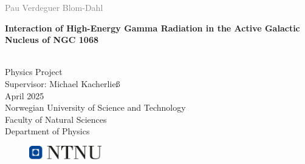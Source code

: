 \documentclass[a4paper, 12pt, oneside]{book} %
\begin{document}


\begin{titlepage}
\vspace*{1.5cm}

\noindent  \textcolor{gray}{\large Pau Verdeguer Blom-Dahl} \\
\vspace{1cm}

\noindent \textbf{\Large Interaction of High-Energy Gamma Radiation in the Active Galactic Nucleus of NGC 1068} \\
\vspace{0.5cm}

 \\



\vspace{7cm}
\noindent Physics Project\\
Supervisor: Michael Kacherließ \\
April 2025 \\

\vspace{0.2cm}
\noindent Norwegian University of Science and Technology \\
Faculty of Natural Sciences \\
Department of Physics \\

\begin{figure}[h]
    \includegraphics[width=0.28\textwidth]{Figures/ntnu_basic.png}
\end{figure}
\end{titlepage}


\end{document}
